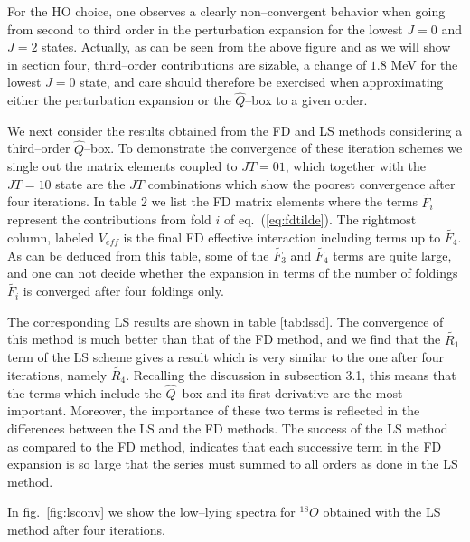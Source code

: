 For the HO choice, one observes a clearly non--convergent behavior
when going from second to third order in the perturbation expansion for the
lowest $J=0$ and $J=2$ states.
Actually, as can be seen from the above figure and  as we will show
in section four, third--order contributions are sizable,  a
change of $1.8$ MeV for the lowest $J=0$ state, and care should therefore
be exercised when approximating either the perturbation expansion or the
$\hat{Q}$--box to a given order.


We next consider the results obtained from the FD and LS methods
considering a third--order $\hat{Q}$--box. To demonstrate the convergence
of these iteration schemes we single out the matrix elements coupled
to $JT=01$, which together with the $JT=10$ state are the $JT$ combinations
which show the poorest convergence after four iterations. In table
2  we list the FD matrix elements where the terms
$\tilde{F_i}$ represent
the contributions from fold $i$ of eq.\ (\ref{eq:fdtilde}). The rightmost
column, labeled $V_{eff}$ is the final FD effective interaction including
terms up to $\tilde{F_4}$. As can be deduced from this table, some
of the $\tilde{F_3}$ and $\tilde{F_4}$ terms are quite large, and one can not
decide whether the expansion in terms of the number of foldings $\tilde{F_i}$
is converged after four foldings  only.

The corresponding LS results are shown in table \ref{tab:lssd}.
The convergence of this method is much better
than
that of the FD method, and we find that the  $\tilde{R_1}$ term of the LS scheme gives a result
which is very similar to the one after four iterations, namely $\tilde{R_4}$.
Recalling the discussion in subsection 3.1, this
means that the terms which include the $\hat{Q}$--box and
its first derivative are the most important. Moreover,
the importance of these two terms is reflected in
the differences between the LS and the FD methods. The success of the LS method as compared
to the FD method, indicates that each successive term in the FD expansion is so large
that the series must summed to all orders as done in the LS method.


In fig.\ \ref{fig:lsconv}
we show the low--lying spectra  for $^{18}O$ obtained with the LS method after
four iterations.

